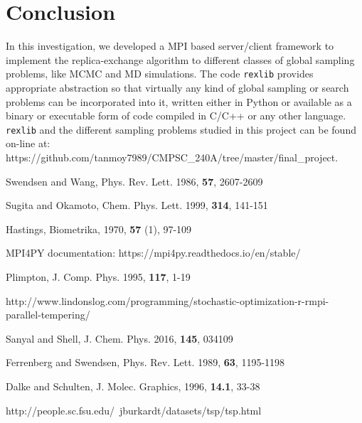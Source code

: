 \documentclass[12pt,letterpaper]{article}
\begin{document}
\section*{Conclusion}
\noindent In this investigation, we developed a MPI based server/client framework to implement the replica-exchange algorithm to different classes of global sampling problems, like MCMC and MD simulations. The code \texttt{rexlib} provides appropriate abstraction so that virtually any kind of global sampling or search problems can be incorporated into it, written either in Python or available as a binary or executable form of code compiled in C/C++ or any other language. \texttt{rexlib} and the different sampling problems studied in this project can be found on-line at:\\
 https://github.com/tanmoy7989/CMPSC\_240A/tree/master/final\_project.

\newpage

\begin{thebibliography}{9}
Swendsen and Wang,
Phys. Rev. Lett. 1986, \textbf{57}, 2607-2609
 
Sugita and Okamoto,
Chem. Phys. Lett. 1999, \textbf{314}, 141-151
 
Hastings,
Biometrika, 1970, \textbf{57} (1), 97-109

MPI4PY documentation: https://mpi4py.readthedocs.io/en/stable/

Plimpton,
J. Comp. Phys. 1995, \textbf{117}, 1-19

http://www.lindonslog.com/programming/stochastic-optimization-r-rmpi-parallel-tempering/

Sanyal and Shell,
J. Chem. Phys. 2016, \textbf{145}, 034109

Ferrenberg and Swendsen,
Phys. Rev. Lett. 1989, \textbf{63}, 1195-1198

Dalke and Schulten,
J. Molec. Graphics, 1996, \textbf{14.1}, 33-38 

http://people.sc.fsu.edu/~jburkardt/datasets/tsp/tsp.html

\end{thebibliography}
\end{document}
